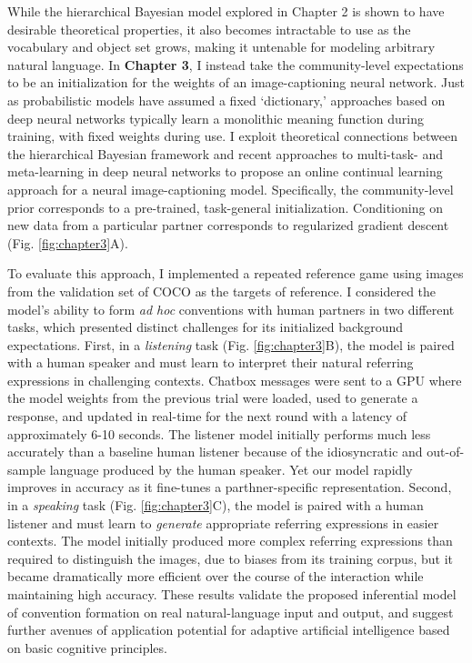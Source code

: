 \documentclass[11pt]{article}
\begin{document}
While the hierarchical Bayesian model explored in Chapter 2 is shown to have desirable theoretical properties, it also becomes intractable to use as the vocabulary and object set grows, making it untenable for modeling arbitrary natural language.
In \textbf{Chapter 3}, I instead take the community-level expectations to be an initialization for the weights of an image-captioning neural network.
Just as probabilistic models have assumed a fixed `dictionary,' approaches based on deep neural networks typically learn a monolithic meaning function during training, with fixed weights during use.
I exploit theoretical connections between the hierarchical Bayesian framework and recent  approaches to multi-task- and meta-learning in deep neural networks \cite{nagabandi_deep_2018,grant_recasting_2018,jerfel_online_2018} to propose an online continual learning approach for a neural image-captioning model.
Specifically, the community-level prior corresponds to a pre-trained, task-general initialization.
Conditioning on new data from a particular partner corresponds to regularized gradient descent (Fig. \ref{fig:chapter3}A).

To evaluate this approach, I implemented a repeated reference game using images from the validation set of COCO \cite{lin2014microsoft} as the targets of reference.
I considered the model's ability to form \emph{ad hoc} conventions with human partners in two different tasks, which presented distinct challenges for its initialized background expectations.
First, in a \emph{listening} task (Fig. \ref{fig:chapter3}B), the model is paired with a human speaker and must learn to interpret their natural referring expressions in challenging contexts.
Chatbox messages were sent to a GPU where the model weights from the previous trial were loaded, used to generate a response, and updated in real-time for the next round with a latency of approximately 6-10 seconds.
The listener model initially performs much less accurately than a baseline human listener because of the idiosyncratic and out-of-sample language produced by the human speaker.
Yet our model rapidly improves in accuracy as it fine-tunes a parthner-specific representation.
Second, in a \emph{speaking} task (Fig. \ref{fig:chapter3}C), the model is paired with a human listener and must learn to \emph{generate} appropriate referring expressions in easier contexts.
The model initially produced more complex referring expressions than required to distinguish the images, due to biases from its training corpus, but it became dramatically more efficient over the course of the interaction while maintaining high accuracy. 
These results validate the proposed inferential model of convention formation on real natural-language input and output, and suggest further avenues of application potential for adaptive artificial intelligence based on basic cognitive principles.
\end{document}
